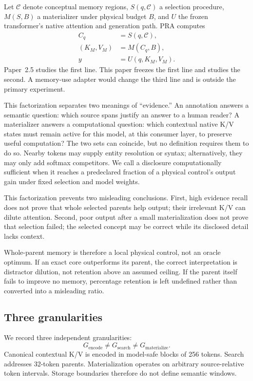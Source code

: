 \documentclass[11pt]{article}
\begin{document}
Let $\mathcal{C}$ denote conceptual memory regions, $S(q,\mathcal{C})$ a selection procedure,
$M(S,B)$ a materializer under physical budget $B$, and $U$ the frozen transformer's native
attention and generation path.  PRA computes
\begin{align}
 C_q &= S(q,\mathcal{C}),\\
 (K_M,V_M) &= M(C_q,B),\\
 y &= U(q,K_M,V_M).
\end{align}
Paper~2.5 studies the first line.  This paper freezes the first line and studies the second.  A
memory-use adapter would change the third line and is outside the primary experiment.

This factorization separates two meanings of ``evidence.''  An annotation answers a semantic
question: which source spans justify an answer to a human reader?  A materializer answers a
computational question: which contextual native K/V states must remain active for this model, at
this consumer layer, to preserve useful computation?  The two sets can coincide, but no definition
requires them to do so.  Nearby tokens may supply entity resolution or syntax; alternatively, they
may only add softmax competitors.  We call a disclosure computationally sufficient when it reaches
a predeclared fraction of a physical control's output gain under fixed selection and model weights.

This factorization prevents two misleading conclusions.  First, high evidence recall does not
prove that whole selected parents help output; their irrelevant K/V can dilute attention.  Second,
poor output after a small materialization does not prove that selection failed; the selected
concept may be correct while its disclosed detail lacks context.

Whole-parent memory is therefore a local physical control, not an oracle optimum.  If an exact
core outperforms its parent, the correct interpretation is distractor dilution, not retention above
an assumed ceiling.  If the parent itself fails to improve no memory, percentage retention is left
undefined rather than converted into a misleading ratio.

\subsection{Three granularities}

We record three independent granularities:
\begin{equation}
 G_{\mathrm{encode}} \ne G_{\mathrm{search}} \ne G_{\mathrm{materialize}}.
\end{equation}
Canonical contextual K/V is encoded in model-safe blocks of 256 tokens.  Search addresses
32-token parents.  Materialization operates on arbitrary source-relative token intervals.  Storage
boundaries therefore do not define semantic windows.
\end{document}
